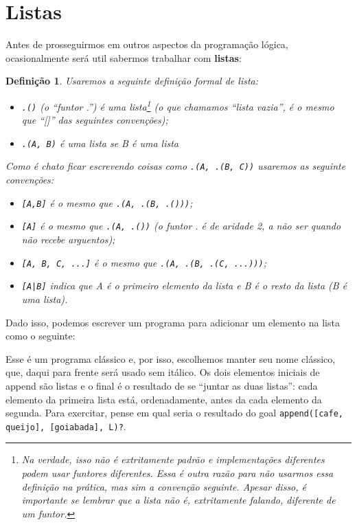 \documentclass{article}
\newtheorem{definition}{Definição}[section]
\theoremstyle{remark}
\begin{document}
\section{Listas}

Antes de prosseguirmos em outros aspectos da programação lógica, ocasionalmente será util sabermos trabalhar com \textbf{listas}:

\begin{definition}
  Usaremos a seguinte definição formal de lista:
  \begin{itemize}
    \item {\tt .()} (o ``funtor .'') é uma lista\footnote{Na verdade, isso não é extritamente padrão e implementações diferentes podem usar funtores diferentes. Essa é outra razão para não usarmos essa definição na prática, mas sim a convenção seguinte. Apesar disso, é importante se lembrar que a lista não é, extritamente falando, diferente de um funtor.} (o que chamamos ``lista vazia'', é o mesmo que ``[]'' das seguintes convenções);
    \item {\tt .(A, B)} é uma lista se B é uma lista
  \end{itemize}
  Como é chato ficar escrevendo coisas como {\tt.(A, .(B, C))} usaremos as seguinte convenções:
  \begin{itemize}
    \item {\tt [A,B]} é o mesmo que {\tt .(A, .(B, .()))};
    \item {\tt [A]} é o mesmo que {\tt .(A, .())} (o funtor . é de aridade 2, a não ser quando não recebe arguentos);
    \item {\tt [A, B, C, ...]} é o mesmo que {\tt .(A, .(B, .(C, ...)))};
    \item {\tt [A|B]} indica que A é o primeiro elemento da lista e B é o resto da lista (B é uma lista).
  \end{itemize}
\end{definition}

Dado isso, podemos escrever um programa para adicionar um elemento na lista como o seguinte:



Esse é um programa clássico e, por isso, escolhemos manter seu nome clássico, que, daqui para frente será usado sem itálico. Os dois elementos iniciais de append são listas e o final é o resultado de se ``juntar as duas listas'': cada elemento da primeira lista está, ordenadamente, antes da cada elemento da segunda. Para exercitar, pense em qual seria o resultado do goal {\tt append([cafe, queijo], [goiabada], L)?}.
\end{document}
